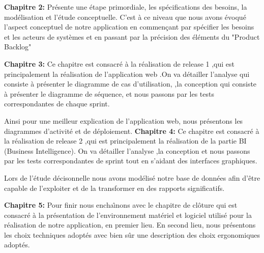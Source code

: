 \bigskip
\textbf{Chapitre 2:}
Pr\'{e}sente une \'{e}tape primordiale, les sp\'{e}cifications des besoins, la mod\'{e}lisation
et l'\'{e}tude conceptuelle. C'est \`{a} ce niveau que nous avons \'{e}voqu\'{e} l'aspect
conceptuel de notre application en commen\c{c}ant par sp\'{e}cifier les besoins et les
acteurs de syst\`{e}mes et en passant par la pr\'{e}cision des \'{e}l\'{e}ments du "Product Backlog"

\bigskip

\textbf{Chapitre 3:}
Ce chapitre est consacr\'{e} à la r\'{e}alisation de release 1 ,qui est principalement la r\'{e}alisation de l'application
web .On va d\'{e}tailler l'analyse qui consiste à pr\'{e}senter le
diagramme de cas d'utilisation, ,la conception
qui consiste à pr\'{e}senter le diagramme de s\'{e}quence,
et nous passons par les tests correspondantes de chaque sprint.

Ainsi pour une meilleur explication de l'application web, nous pr\'{e}sentons les diagrammes
d'activit\'{e} et de d\'{e}ploiement.
\newline
\bigskip
\textbf{Chapitre 4:}
Ce chapitre est consacr\'{e} à la r\'{e}alisation de release 2 ,qui est principalement la r\'{e}alisation de la partie BI (Business Intelligence).
On va d\'{e}tailler l'analyse ,la conception et nous passons  par les tests correspondantes de sprint tout en s'aidant des
interfaces graphiques.

Lors de l'\'{e}tude décisonnelle nous avons mod\'{e}lis\'{e} notre base de donn\'{e}es afin d'\^{e}tre capable de
l'exploiter et de la transformer en des rapports significatifs.


\textbf{Chapitre 5:}
Pour finir nous encha\^{\i}nons avec le chapitre de cl\^{o}ture qui est consacr\'{e} \`{a} la
pr\'{e}sentation de l'environnement mat\'{e}riel et logiciel utilis\'{e} pour la r\'{e}alisation
de notre application, en premier lieu. En second lieu, nous  pr\'{e}sentons les
choix techniques adopt\'{e}s  avec bien s\^{u}r une
description des choix ergonomiques adopt\'{e}s.






